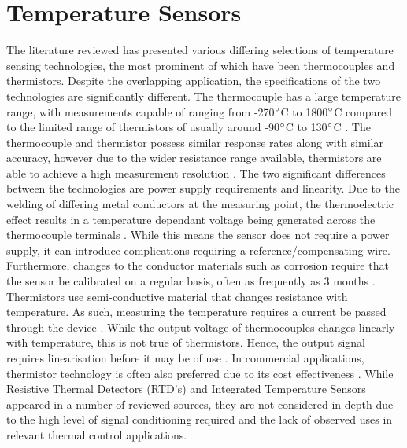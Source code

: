 \section{Temperature Sensors}
The literature reviewed has presented various differing selections of temperature sensing technologies, the most prominent of which have been thermocouples and thermistors. Despite the overlapping application, the specifications of the two technologies are significantly different. The thermocouple has a large temperature range, with measurements capable of ranging from -270$\degree$C to 1800$\degree$C compared to the limited range of thermistors of usually around -90$\degree$C to 130$\degree$C \cite{11303490}\cite{15156909}\cite{10650397}. The thermocouple and thermistor possess similar response rates along with similar accuracy, however due to the wider resistance range available, thermistors are able to achieve a high measurement resolution \cite{11303490}\cite{15156909}\cite{10650397}. The two significant differences between the technologies are power supply requirements and linearity. Due to the welding of differing metal conductors at the measuring point, the thermoelectric effect results in a temperature dependant voltage being generated across the thermocouple terminals \cite{11303490}\cite{10650397}\cite{15156909}. While this means the sensor does not require a power supply, it can introduce complications requiring a reference/compensating wire. Furthermore, changes to the conductor materials such as corrosion require that the sensor be calibrated on a regular basis, often as frequently as 3 months \cite{11303490}\cite{15156909}\cite{10650397}. Thermistors use semi-conductive material that changes resistance with temperature. As such, measuring the temperature requires a current be passed through the device \cite{11303490}\cite{15156909}. While the output voltage of thermocouples changes linearly with temperature, this is not true of thermistors. Hence, the output signal requires linearisation before it may be of use \cite{15156909}. In commercial applications, thermistor technology is often also preferred due to its cost effectiveness \cite{10650397}. While Resistive Thermal Detectors (RTD's) and Integrated Temperature Sensors appeared in a number of reviewed sources, they are not considered in depth due to the high level of signal conditioning required \cite{10650397}\cite{11303490} and the lack of observed uses in relevant thermal control applications.

